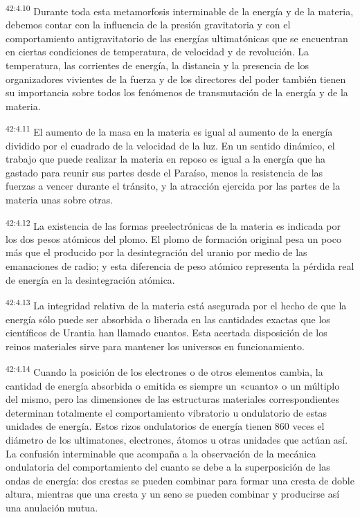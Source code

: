 \par
\textsuperscript{42:4.10} Durante toda esta metamorfosis interminable de la energía y de la materia, debemos contar con la influencia de la presión gravitatoria y con el comportamiento antigravitatorio de las energías ultimatónicas que se encuentran en ciertas condiciones de temperatura, de velocidad y de revolución. La temperatura, las corrientes de energía, la distancia y la presencia de los organizadores vivientes de la fuerza y de los directores del poder también tienen su importancia sobre todos los fenómenos de transmutación de la energía y de la materia.

\par
\textsuperscript{42:4.11} El aumento de la masa en la materia es igual al aumento de la energía dividido por el cuadrado de la velocidad de la luz. En un sentido dinámico, el trabajo que puede realizar la materia en reposo es igual a la energía que ha gastado para reunir sus partes desde el Paraíso, menos la resistencia de las fuerzas a vencer durante el tránsito, y la atracción ejercida por las partes de la materia unas sobre otras.

\par
\textsuperscript{42:4.12} La existencia de las formas preelectrónicas de la materia es indicada por los dos pesos atómicos del plomo. El plomo de formación original pesa un poco más que el producido por la desintegración del uranio por medio de las emanaciones de radio; y esta diferencia de peso atómico representa la pérdida real de energía en la desintegración atómica.

\par
\textsuperscript{42:4.13} La integridad relativa de la materia está asegurada por el hecho de que la energía sólo puede ser absorbida o liberada en las cantidades exactas que los científicos de Urantia han llamado cuantos. Esta acertada disposición de los reinos materiales sirve para mantener los universos en funcionamiento.

\par
\textsuperscript{42:4.14} Cuando la posición de los electrones o de otros elementos cambia, la cantidad de energía absorbida o emitida es siempre un «cuanto» o un múltiplo del mismo, pero las dimensiones de las estructuras materiales correspondientes determinan totalmente el comportamiento vibratorio u ondulatorio de estas unidades de energía. Estos rizos ondulatorios de energía tienen 860 veces el diámetro de los ultimatones, electrones, átomos u otras unidades que actúan así. La confusión interminable que acompaña a la observación de la mecánica ondulatoria del comportamiento del cuanto se debe a la superposición de las ondas de energía: dos crestas se pueden combinar para formar una cresta de doble altura, mientras que una cresta y un seno se pueden combinar y producirse así una anulación mutua.

